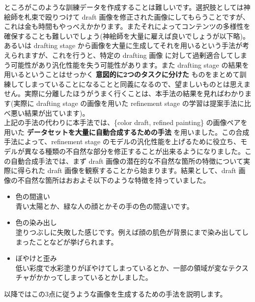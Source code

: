 \documentclass[a4paper, dvipdfmx, 10pt]{article}
\begin{document}
ところがこのような訓練データを作成することは難しいです。選択肢としては神絵師を札束で殴りつけて draft 画像を修正された画像にしてもらうことですが、これは金も時間もやっべえかかります。またそれによってコンテンツの多様性を確保することも難しいでしょう(神絵師を大量に雇えば良いでしょうが以下略)。あるいは drafting stage から画像を大量に生成してそれを用いるという手法が考えられますが、これを行うと、特定の drafting 画像 に対して過剰適合してしまう可能性があり汎化性能を失う可能性があります。また drafting stage の結果を用いるということはせっかく \textbf{意図的に2つのタスクに分けた} ものをまとめて訓練してしまっていることになることと同義になるので、望ましいものとは思えません。実際に分離したほうがうまく行くことは、本手法の結果を見ればわかります(実際に drafting stage の画像を用いた refinement stage の学習は提案手法に比べ悪い結果が出ています)。\\

上記の手法の代わりに本手法では、\{color draft, refined painting\} の画像ペアを用いた \textbf{データセットを大量に自動合成するための手法} を用いました。この合成手法によって、refinement stage のモデルの汎化性能を上げるために役立ち、モデルが異なる種類の不自然な部分を修正することが出来るようになりました。この自動合成手法では、まず draft 画像の潜在的な不自然な箇所の特徴について実際に得られた draft 画像を観察することから始まります。結果として、draft 画像の不自然な箇所はおおよそ以下のような特徴を持っていました。\\

\begin{itemize}
\item 色の間違い\\

青い太陽とか、緑な人の顔とかその手の色の間違いです。\\

\item 色の染み出し\\

塗りつぶしに失敗した感じです。例えば顔の肌色が背景にまで染み出してしまったことなどが挙げられます。\\

\item ぼやけと歪み\\

低い彩度で水彩塗りがぼやけてしまっているとか、一部の領域が変なテクスチャがかかってしまっているとかしました。\\
\end{itemize}

以降ではこの3点に従うような画像を生成するための手法を説明します。\\
\end{document}
